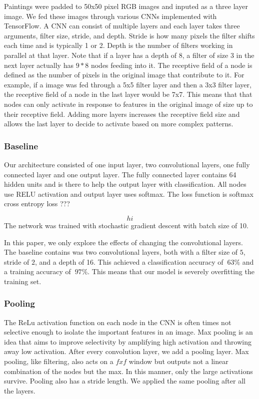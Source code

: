 \documentclass[10pt,twoside]{article}
\begin{document}
\noindent Paintings were padded to 50x50 pixel RGB images and inputed as a three layer image. We fed these images through various CNNs implemented with TensorFlow. A CNN can consist of multiple layers and each layer takes three arguments, filter size, stride, and depth. Stride is how many pixels the filter shifts each time and is typically 1 or 2. Depth is the number of filters working in parallel at that layer. Note that if a layer has a depth of 8, a filter of size 3 in the next layer actually has $9*8$ nodes feeding into it. The receptive field of a node is defined as the number of pixels in the original image that contribute to it. For example, if a image was fed through a 5x5 filter layer and then a 3x3 filter layer, the receptive field of a node in the last layer would be 7x7. This means that that nodes can only activate in response to features in the original image of size up to their receptive field. Adding more layers increases the receptive field size and allows the last layer to decide to activate based on more complex patterns.

\subsubsection{Baseline}
 Our architecture consisted of one input layer, two convolutional layers, one fully connected layer and one output layer. The fully connected layer contains 64 hidden units and is there to help the output layer with classification. All nodes use RELU activation and output layer uses softmax. The loss function is softmax cross entropy loss ???

\begin{equation*}
hi
\end{equation*}
The network was trained with stochastic gradient descent with batch size of 10.

 In this paper, we only explore the effects of changing the convolutional layers. The baseline contains was two convolutional layers, both with a filter size of $5$, stride of $2$, and a depth of 16. This achieved a classification accuracy of $~63\%$ and a training accuracy of $~97\%$. This means that our model is severely overfitting the training set.

\subsubsection{Pooling}
The ReLu activation function on each node in the CNN is often times not selective enough to isolate the important features in an image. Max pooling is an idea that aims to improve selectivity by amplifying high activation and throwing away low activation. After every convolution layer, we add a pooling layer. Max pooling, like filtering, also acts on a $fxf$ window but outputs not a linear combination of the nodes but the max. In this manner, only the large activations survive. Pooling also has a stride length. We applied the same pooling after all the layers.
\end{document}
